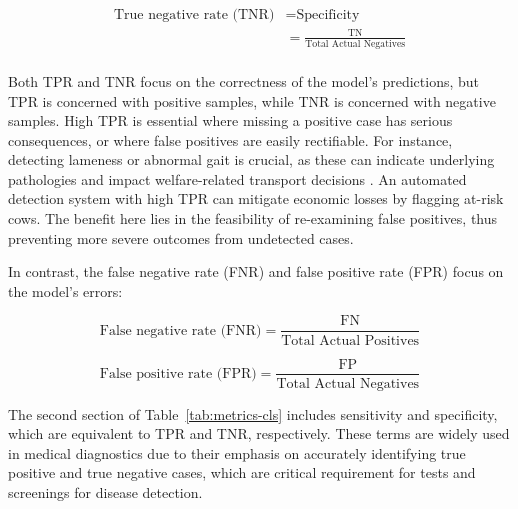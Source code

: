 \begin{equation} \label{eq_TNR}
    \begin{split}
    \text{True negative rate (TNR)} &= \text{Specificity}\\
                    &= \frac{\text{TN}}{\text{Total Actual Negatives}}\\
    \end{split}
\end{equation}

Both TPR and TNR focus on the correctness of the model's predictions, but TPR is concerned with positive samples, while TNR is concerned with negative samples. High TPR is essential where missing a positive case has serious consequences, or where false positives are easily rectifiable. For instance, detecting lameness or abnormal gait is crucial, as these can indicate underlying pathologies \citep{oleary_invited_2020} and impact welfare-related transport decisions \citep{stojkov_hot_2018}. An automated detection system \citep{oleary_invited_2020, alsaaod_automatic_2019,kang_accurate_2020} with high TPR can mitigate economic losses by flagging at-risk cows. The benefit here lies in the feasibility of re-examining false positives, thus preventing more severe outcomes from undetected cases. 


In contrast, the false negative rate (FNR) and false positive rate (FPR) focus on the model's errors:

$$
\text{False negative rate (FNR)} = \frac{\text{FN}}{\text{Total Actual Positives}}
$$

$$
\text{False positive rate (FPR)} = \frac{\text{FP}}{\text{Total Actual Negatives}}
$$

The second section of Table~\ref{tab:metrics-cls} includes sensitivity and specificity, which are equivalent to TPR and TNR, respectively. These terms are widely used in medical diagnostics due to their emphasis on accurately identifying true positive and true negative cases, which are critical requirement for tests and screenings for disease detection.

